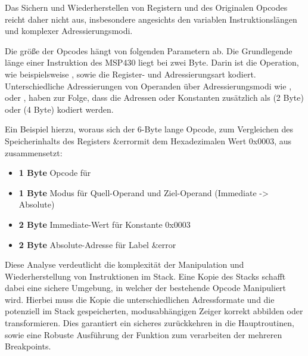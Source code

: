Das Sichern und Wiederherstellen von Registern und des Originalen Opcodes reicht daher nicht aus, insbesondere angesichts den variablen Instruktionsl\"angen und komplexer Adressierungsmodi. 

Die gr\"o{\ss}e der Opcodes h\"angt von folgenden Parametern ab. Die Grundlegende l\"ange einer Instruktion des MSP430 liegt bei zwei Byte. Darin ist die Operation, wie beispielsweise , sowie die Register- und Adressierungsart kodiert. Unterschiedliche Adressierungen von Operanden \"uber Adressierungsmodi wie \glqq {}\grqq , \glqq {} \grqq oder \glqq {}\grqq, haben zur Folge, dass die Adressen oder Konstanten zus\"atzlich als  (2 Byte) oder  (4 Byte) kodiert werden. 

Ein Beispiel hierzu, woraus sich der 6-Byte lange Opcode, zum Vergleichen des Speicherinhalts des Registers \glqq \&error\grqq  mit dem Hexadezimalen Wert \glqq 0x0003\grqq, aus  zusammensetzt:
\\\textbf{}
\begin{itemize}
	\item \textbf{1 Byte} Opcode f\"ur 
	\item \textbf{1 Byte} Modus f\"ur Quell-Operand und Ziel-Operand (Immediate -> Absolute)
	\item \textbf{2 Byte} Immediate-Wert f\"ur Konstante \glqq 0x0003\grqq
	\item \textbf{2 Byte} Absolute-Adresse f\"ur Label \glqq \&error\grqq
\end{itemize}

Diese Analyse verdeutlicht die komplexit\"at der Manipulation und Wiederherstellung von Instruktionen im Stack. Eine Kopie des Stacks schafft dabei eine sichere Umgebung, in welcher der bestehende Opcode Manipuliert wird. Hierbei muss die Kopie die unterschiedlichen Adressformate und die potenziell im Stack gespeicherten, modusabh\"angigen Zeiger korrekt abbilden oder transformieren. Dies garantiert ein sicheres zur\"uckkehren in die Hauptroutinen, sowie eine Robuste Ausf\"uhrung der Funktion zum verarbeiten der \ggf mehreren Breakpoints.

